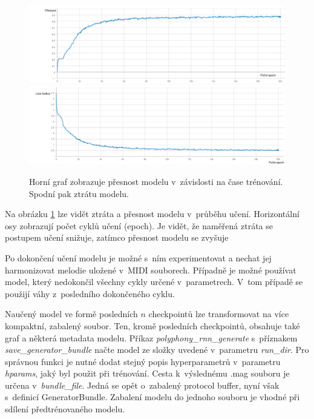 \begin{figure}[h]\centering
    \centering
    \includegraphics[width=1\linewidth]{obrazky/AccuracyEpochOsy.png}\\[1pt]  
    \includegraphics[width=1\linewidth]{obrazky/LossEpochOsy.png}\\[1pt]  
    \caption{Horní graf zobrazuje přesnost modelu v~závislosti na čase trénování.
    Spodní pak ztrátu modelu.}    
    \label{obrazekaccuracyLossPerEpoch}
\end{figure}

Na obrázku \ref{obrazekaccuracyLossPerEpoch} lze vidět ztráta a přesnost modelu v~průběhu učení.
Horizontální osy zobrazují počet cyklů učení (epoch).
Je vidět, že naměřená ztráta se postupem učení snižuje, 
zatímco přesnost modelu se zvyšuje

Po dokončení učení modelu je možné s~ním experimentovat 
a nechat jej harmonizovat melodie uložené v~MIDI souborech.
Případně je možné používat model, který nedokončil všechny cykly určené v~parametrech.
V~tom případě se použijí váhy z~posledního dokončeného cyklu.
\par
Naučený model ve formě posledních $n$ checkpointů lze transformovat
na více kompaktní, zabalený soubor.
Ten, kromě posledních checkpointů, obsahuje také graf a některá metadata modelu.
Příkaz \emph{polyphony\_rnn\_generate} s~příznakem \emph{save\_generator\_bundle}
načte model ze složky uvedené v~parametru \emph{run\_dir}.
Pro správnou funkci je nutné dodat stejný popis hyperparametrů v~parametru \emph{hparams}, 
jaký byl použit při trénování.
Cesta k~výslednému .mag souboru je určena v~\emph{bundle\_file}.
Jedná se opět o~zabalený protocol buffer, nyní však s~definicí GeneratorBundle.
Zabalení modelu do jednoho souboru je vhodné při sdílení předtrénovaného modelu.
\cite{google_git_polyphony}

